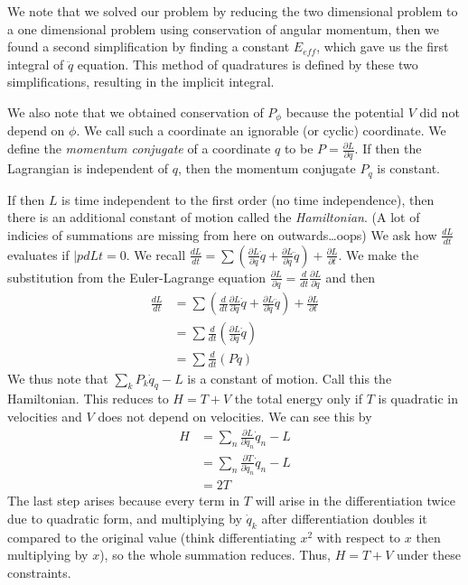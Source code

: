 \documentclass[10pt]{report}
\newcommand{\rd}[2]{\frac{d#1}{d#2}}
\newcommand{\pd}[2]{\frac{\partial #1}{\partial#2}}
\begin{document}
We note that we solved our problem by reducing the two dimensional problem to a one dimensional problem using conservation of angular momentum, then we found a second simplification by finding a constant $E_{eff}$, which gave us the first integral of $\ddot{q}$ equation. This method of quadratures is defined by these two simplifications, resulting in the implicit integral. 

We also note that we obtained conservation of $P_\phi$ because the potential $V$ did not depend on $\phi$. We call such a coordinate an ignorable (or cyclic) coordinate. We define the \emph{momentum conjugate} of a coordinate $q$ to be $P=\pd{L}{\dot{q}}$. If then the Lagrangian is independent of $q$, then the momentum conjugate $P_q$ is constant.

If then $L$ is time independent to the first order (no time independence), then there is an additional constant of motion called the \emph{Hamiltonian}. (A lot of indicies of summations are missing from here on outwards\dots oops) We ask how $\rd{L}{t}$ evaluates if $|pd{L}{t}=0$. We recall $\rd{L}{t}=\sum\left( \pd{L}{q}\dot{q} + \pd{L}{\dot{q}}\ddot{q} \right) + \pd{L}{t}$. We make the substitution from the Euler-Lagrange equation $\pd{L}{q}=\rd{}{t}\pd{L}{\dot{q}}$ and then
\begin{align*}
    \rd{L}{t}&=\sum\left( \rd{}{t}\pd{L}{\dot{q}}\dot{q} + \pd{L}{\dot{q}}\ddot{q} \right) + \pd{L}{t}\\
    &=\sum \rd{}{t}\left( \pd{L}{\dot{q}}\dot{q} \right)\\
    &=\sum \rd{}{t}\left( P\dot{q} \right)
\end{align*}
We thus note that $\sum_k P_k\dot{q}_q -L$ is a constant of motion. Call this the Hamiltonian. This reduces to $H=T+V$ the total energy only if $T$ is quadratic in velocities and $V$ does not depend on velocities. We can see this by
\begin{align*}
    H&=\sum_n \pd{L}{\dot{q}_n}\dot{q}_n -L\\
    &= \sum_n \pd{T}{\dot{q}_n}\dot{q}_n -L\\
    &= 2T
\end{align*}
The last step arises because every term in $T$ will arise in the differentiation twice due to quadratic form, and multiplying by $\dot{q}_k$ after differentiation doubles it compared to the original value (think differentiating $x^2$ with respect to $x$ then multiplying by $x$), so the whole summation reduces. Thus, $H=T+V$ under these constraints.
\end{document}
